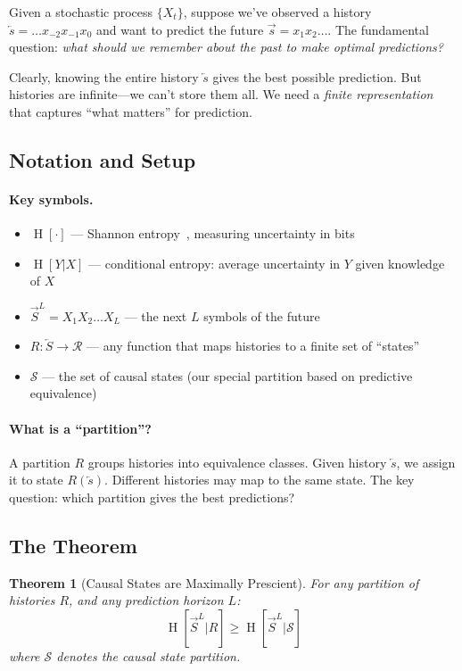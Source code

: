 \documentclass[11pt,a4paper]{article}
\theoremstyle{definition}
\theoremstyle{plain}
\newtheorem{theorem}{Theorem}[section]
\newcommand{\calS}{\mathcal{S}}
\newcommand{\Past}{\overleftarrow{S}}
\newcommand{\Future}{\overrightarrow{S}}
\newcommand{\past}{\overleftarrow{s}}
\newcommand{\future}{\overrightarrow{s}}
\DeclareMathOperator{\Ent}{H}
\begin{document}
Given a stochastic process $\{X_t\}$, suppose we've observed a history $\past = \ldots x_{-2} x_{-1} x_0$ and want to predict the future $\future = x_1 x_2 \ldots$. The fundamental question: \emph{what should we remember about the past to make optimal predictions?}

Clearly, knowing the entire history $\past$ gives the best possible prediction. But histories are infinite---we can't store them all. We need a \emph{finite representation} that captures ``what matters'' for prediction.

\subsection{Notation and Setup}

\paragraph{Key symbols.}
\begin{itemize}[nosep]
    \item $\Ent[\cdot]$ --- Shannon entropy~\cite{shannon1948mathematical}, measuring uncertainty in bits
    \item $\Ent[Y | X]$ --- conditional entropy: average uncertainty in $Y$ given knowledge of $X$
    \item $\Future^L = X_1 X_2 \ldots X_L$ --- the next $L$ symbols of the future
    \item $R : \Past \to \mathcal{R}$ --- any function that maps histories to a finite set of ``states''
    \item $\calS$ --- the set of causal states (our special partition based on predictive equivalence)
\end{itemize}

\paragraph{What is a ``partition''?} A partition $R$ groups histories into equivalence classes. Given history $\past$, we assign it to state $R(\past)$. Different histories may map to the same state. The key question: which partition gives the best predictions?

\subsection{The Theorem}

\begin{theorembox}[title=Theorem 1: Prescience~\cite{shalizi2001computational}]
\begin{theorem}[Causal States are Maximally Prescient]
\label{thm:prescience}
For any partition of histories $R$, and any prediction horizon $L$:
\begin{equation}
    \Ent[\Future^L | R] \geq \Ent[\Future^L | \calS]
\end{equation}
where $\calS$ denotes the causal state partition.
\end{theorem}
\end{theorembox}
\end{document}
